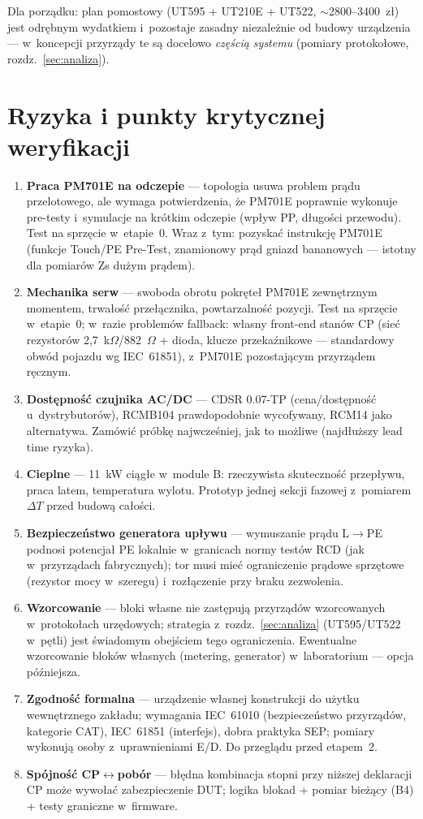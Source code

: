 \documentclass[11pt,a4paper]{article}
\newcommand{\ohm}{$\Omega$}
\begin{document}
Dla porządku: plan pomostowy (UT595 + UT210E + UT522, $\sim$2800--3400~zł) jest odrębnym wydatkiem i~pozostaje zasadny niezależnie od budowy urządzenia --- w~koncepcji przyrządy te są docelowo \emph{częścią systemu} (pomiary protokołowe, rozdz.~\ref{sec:analiza}).

\section{Ryzyka i punkty krytycznej weryfikacji}
\label{sec:ryzyka}

\begin{enumerate}[label=\textbf{R\arabic*.}]
\item \textbf{Praca PM701E na odczepie} --- topologia usuwa problem prądu przelotowego, ale wymaga potwierdzenia, że PM701E poprawnie wykonuje pre-testy i~symulacje na krótkim odczepie (wpływ PP, długości przewodu). Test na sprzęcie w~etapie~0. Wraz z~tym: pozyskać instrukcję PM701E (funkcje Touch/PE Pre-Test, znamionowy prąd gniazd bananowych --- istotny dla pomiarów Zs dużym prądem).
\item \textbf{Mechanika serw} --- swoboda obrotu pokręteł PM701E zewnętrznym momentem, trwałość przełącznika, powtarzalność pozycji. Test na sprzęcie w~etapie~0; w~razie problemów fallback: własny front-end stanów CP (sieć rezystorów 2,7~k\ohm/882~\ohm{} + dioda, klucze przekaźnikowe --- standardowy obwód pojazdu wg IEC~61851), z~PM701E pozostającym przyrządem ręcznym.
\item \textbf{Dostępność czujnika AC/DC} --- CDSR 0.07-TP (cena/dostępność u~dystrybutorów), RCMB104 prawdopodobnie wycofywany, RCM14 jako alternatywa. Zamówić próbkę najwcześniej, jak to możliwe (najdłuższy lead time ryzyka).
\item \textbf{Cieplne} --- 11~kW ciągłe w~module B: rzeczywista skuteczność przepływu, praca latem, temperatura wylotu. Prototyp jednej sekcji fazowej z~pomiarem $\Delta T$ przed budową całości.
\item \textbf{Bezpieczeństwo generatora upływu} --- wymuszanie prądu L$\rightarrow$PE podnosi potencjał PE lokalnie w~granicach normy testów RCD (jak w~przyrządach fabrycznych); tor musi mieć ograniczenie prądowe sprzętowe (rezystor mocy w~szeregu) i~rozłączenie przy braku zezwolenia.
\item \textbf{Wzorcowanie} --- bloki własne nie zastępują przyrządów wzorcowanych w~protokołach urzędowych; strategia z~rozdz.~\ref{sec:analiza} (UT595/UT522 w~pętli) jest świadomym obejściem tego ograniczenia. Ewentualne wzorcowanie bloków własnych (metering, generator) w~laboratorium --- opcja późniejsza.
\item \textbf{Zgodność formalna} --- urządzenie własnej konstrukcji do użytku wewnętrznego zakładu; wymagania IEC~61010 (bezpieczeństwo przyrządów, kategorie CAT), IEC~61851 (interfejs), dobra praktyka SEP; pomiary wykonują osoby z~uprawnieniami E/D. Do przeglądu przed etapem~2.
\item \textbf{Spójność CP$\leftrightarrow$pobór} --- błędna kombinacja stopni przy niższej deklaracji CP może wywołać zabezpieczenie DUT; logika blokad + pomiar bieżący (B4) + testy graniczne w~firmware.
\end{enumerate}
\end{document}
